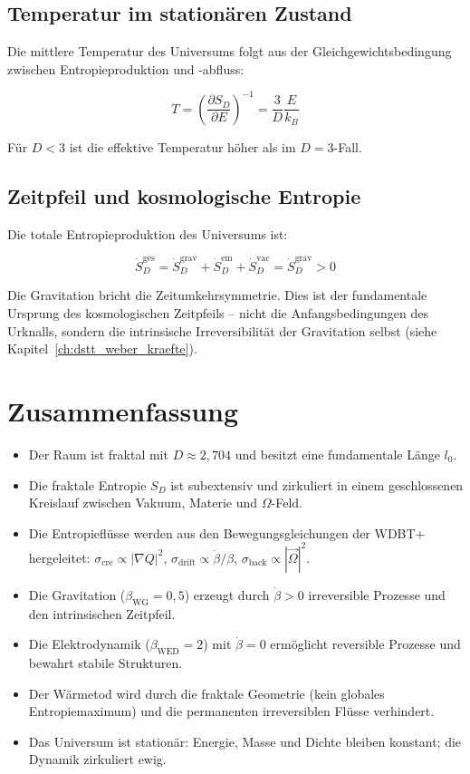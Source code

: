 \subsection{Temperatur im stationären Zustand}
\label{sub:fraktale_entropie_temperatur}

Die mittlere Temperatur des Universums folgt aus der Gleichgewichtsbedingung zwischen Entropieproduktion und -abfluss:

\[
T = \left( \frac{\partial S_D}{\partial E} \right)^{-1} = \frac{3}{D} \frac{E}{k_B} \tag{L.19}
\]

Für \( D < 3 \) ist die effektive Temperatur höher als im \( D = 3 \)-Fall.

\subsection{Zeitpfeil und kosmologische Entropie}
\label{sub:fraktale_entropie_zeitpfeil}

Die totale Entropieproduktion des Universums ist:

\[
\dot{S}_D^{\text{ges}} = \dot{S}_D^{\text{grav}} + \dot{S}_D^{\text{em}} + \dot{S}_D^{\text{vac}} = \dot{S}_D^{\text{grav}} > 0 \tag{L.20}
\]

Die Gravitation bricht die Zeitumkehrsymmetrie. Dies ist der fundamentale Ursprung des kosmologischen Zeitpfeils – nicht die Anfangsbedingungen des Urknalls, sondern die intrinsische Irreversibilität der Gravitation selbst (siehe Kapitel~\ref{ch:dstt_weber_kraefte}).

\section{Zusammenfassung}
\label{app:fraktale_entropie_zusammenfassung}

\begin{itemize}
    \item Der Raum ist fraktal mit \( D \approx 2,704 \) und besitzt eine fundamentale Länge \( l_0 \).
    \item Die fraktale Entropie \( S_D \) ist subextensiv und zirkuliert in einem geschlossenen Kreislauf zwischen Vakuum, Materie und \( \Omega \)-Feld.
    \item Die Entropieflüsse werden aus den Bewegungsgleichungen der WDBT+ hergeleitet:
          \( \sigma_{\text{cre}} \propto |\nabla Q|^2 \), 
          \( \sigma_{\text{drift}} \propto \dot{\beta}/\beta \), 
          \( \sigma_{\text{back}} \propto |\vec{\Omega}|^2 \).
    \item Die Gravitation (\( \beta_{\text{WG}} = 0,5 \)) erzeugt durch \( \dot{\beta} > 0 \) irreversible Prozesse und den intrinsischen Zeitpfeil.
    \item Die Elektrodynamik (\( \beta_{\text{WED}} = 2 \)) mit \( \dot{\beta} = 0 \) ermöglicht reversible Prozesse und bewahrt stabile Strukturen.
    \item Der Wärmetod wird durch die fraktale Geometrie (kein globales Entropiemaximum) und die permanenten irreversiblen Flüsse verhindert.
    \item Das Universum ist stationär: Energie, Masse und Dichte bleiben konstant; die Dynamik zirkuliert ewig.
\end{itemize}